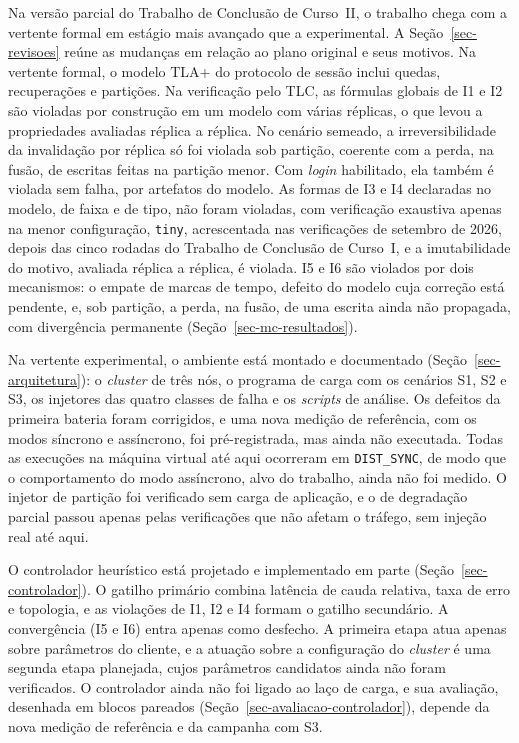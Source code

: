 Na versão parcial do Trabalho de Conclusão de Curso~II, o trabalho chega com a vertente formal em estágio mais avançado que a experimental. A Seção~\ref{sec-revisoes} reúne as mudanças em relação ao plano original e seus motivos. Na vertente formal, o modelo TLA+ do protocolo de sessão inclui quedas, recuperações e partições. Na verificação pelo TLC, as fórmulas globais de I1 e I2 são violadas por construção em um modelo com várias réplicas, o que levou a propriedades avaliadas réplica a réplica. No cenário semeado, a irreversibilidade da invalidação por réplica só foi violada sob partição, coerente com a perda, na fusão, de escritas feitas na partição menor. Com \emph{login} habilitado, ela também é violada sem falha, por artefatos do modelo. As formas de I3 e I4 declaradas no modelo, de faixa e de tipo, não foram violadas, com verificação exaustiva apenas na menor configuração, \texttt{tiny}, acrescentada nas verificações de setembro de 2026, depois das cinco rodadas do Trabalho de Conclusão de Curso~I, e a imutabilidade do motivo, avaliada réplica a réplica, é violada. I5 e I6 são violados por dois mecanismos: o empate de marcas de tempo, defeito do modelo cuja correção está pendente, e, sob partição, a perda, na fusão, de uma escrita ainda não propagada, com divergência permanente (Seção~\ref{sec-mc-resultados}).

Na vertente experimental, o ambiente está montado e documentado (Seção~\ref{sec-arquitetura}): o \emph{cluster} de três nós, o programa de carga com os cenários S1, S2 e S3, os injetores das quatro classes de falha e os \emph{scripts} de análise. Os defeitos da primeira bateria foram corrigidos, e uma nova medição de referência, com os modos síncrono e assíncrono, foi pré-registrada, mas ainda não executada. Todas as execuções na máquina virtual até aqui ocorreram em \texttt{DIST\_SYNC}, de modo que o comportamento do modo assíncrono, alvo do trabalho, ainda não foi medido. O injetor de partição foi verificado sem carga de aplicação, e o de degradação parcial passou apenas pelas verificações que não afetam o tráfego, sem injeção real até aqui.

O controlador heurístico está projetado e implementado em parte (Seção~\ref{sec-controlador}). O gatilho primário combina latência de cauda relativa, taxa de erro e topologia, e as violações de I1, I2 e I4 formam o gatilho secundário. A convergência (I5 e I6) entra apenas como desfecho. A primeira etapa atua apenas sobre parâmetros do cliente, e a atuação sobre a configuração do \emph{cluster} é uma segunda etapa planejada, cujos parâmetros candidatos ainda não foram verificados. O controlador ainda não foi ligado ao laço de carga, e sua avaliação, desenhada em blocos pareados (Seção~\ref{sec-avaliacao-controlador}), depende da nova medição de referência e da campanha com S3.

